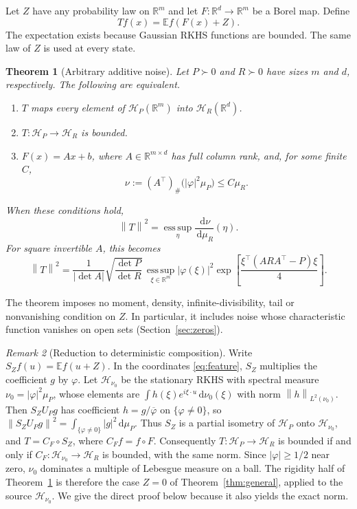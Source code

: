 \documentclass[11pt,a4paper]{article}
\newtheorem{theorem}{Theorem}[section]
\theoremstyle{remark}
\newtheorem{remark}[theorem]{Remark}
\newcommand{\R}{\mathbb R}
\newcommand{\E}{\mathbb E}
\newcommand{\HH}{\mathcal H}
\newcommand{\dd}{\,\mathrm d}
\newcommand{\norm}[1]{\left\lVert#1\right\rVert}
\newcommand{\esssup}{\operatorname*{ess\,sup}}
\begin{document}
Let $Z$ have any probability law on $\R^m$ and let $F:\R^d\to\R^m$ be a
Borel map. Define
\begin{equation}\label{eq:additive}
 Tf(x)=\E f(F(x)+Z).
\end{equation}
The expectation exists because Gaussian RKHS functions are bounded. The
same law of $Z$ is used at every state.

\begin{theorem}[Arbitrary additive noise]\label{thm:additive}
Let $P\succ0$ and $R\succ0$ have sizes $m$ and $d$, respectively.
The following are equivalent.
\begin{enumerate}
\item $T$ maps every element of $\HH_P(\R^m)$ into $\HH_R(\R^d)$.
\item $T:\HH_P\to\HH_R$ is bounded.
\item $F(x)=Ax+b$, where $A\in\R^{m\times d}$ has full column rank,
and, for some finite $C$,
\begin{equation}\label{eq:measurecondition}
 \nu:=(A^\top)_\#\bigl(|\varphi|^2\mu_P\bigr)\le C\mu_R .
\end{equation}
\end{enumerate}
When these conditions hold,
\begin{equation}\label{eq:norm}
 \norm{T}^2=\esssup_{\eta}\frac{\dd\nu}{\dd\mu_R}(\eta).
\end{equation}
For square invertible $A$, this becomes
\begin{equation}\label{eq:squarenorm}
 \norm{T}^2=
 \frac{1}{|\det A|}\sqrt{\frac{\det P}{\det R}}\,
 \esssup_{\xi\in\R^m}
 |\varphi(\xi)|^2
 \exp\!\left[\frac{\xi^\top(ARA^\top-P)\xi}{4}\right].
\end{equation}
\end{theorem}

The theorem imposes no moment, density, infinite-divisibility, tail or
nonvanishing condition on $Z$. In particular, it includes noise whose
characteristic function vanishes on open sets (Section~\ref{sec:zeros}).

\begin{remark}[Reduction to deterministic composition]\label{rem:reduction}
Write $S_Zf(u)=\E f(u+Z)$. In the coordinates \eqref{eq:feature},
$S_Z$ multiplies the coefficient $g$ by $\varphi$. Let
$\HH_{\nu_0}$ be the stationary RKHS with spectral measure
$\nu_0=|\varphi|^2\mu_P$, whose elements are
$\int h(\xi)e^{i\xi\cdot u}\dd\nu_0(\xi)$ with norm
$\norm{h}_{L^2(\nu_0)}$. Then $S_ZU_Pg$ has coefficient
$h=g/\overline\varphi$ on $\{\varphi\ne0\}$, so
$\norm{S_ZU_Pg}^2=\int_{\{\varphi\ne0\}}|g|^2\dd\mu_P$. Thus $S_Z$ is a
partial isometry of $\HH_P$ onto $\HH_{\nu_0}$, and $T=C_F\circ S_Z$,
where $C_Ff=f\circ F$. Consequently $T:\HH_P\to\HH_R$ is bounded if and
only if $C_F:\HH_{\nu_0}\to\HH_R$ is bounded, with the same norm. Since
$|\varphi|\ge1/2$ near zero, $\nu_0$ dominates a multiple of Lebesgue
measure on a ball. The rigidity half of Theorem~\ref{thm:additive} is
therefore the case $Z=0$ of Theorem~\ref{thm:general}, applied to the
source $\HH_{\nu_0}$. We give the direct proof below because it also
yields the exact norm.
\end{remark}
\end{document}
